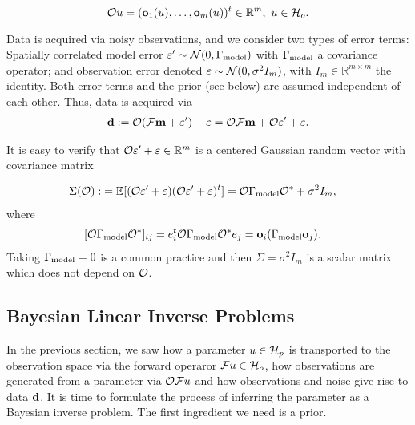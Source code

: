 \begin{equation*}%
  \obs u = (\meas_1(u), \dots, \meas_m(u) )^t \in \R^m,\ u \in \hilo.
\end{equation*}

Data is acquired via noisy observations, and we consider two types of
error terms: Spatially correlated model error \(\varepsilon' \sim
\mathcal{N}(0,\Gamma_{\textup{model}})\) with \(\Gamma_{\textup{model}}\) a covariance operator; and
observation error denoted \(\varepsilon \sim \mathcal{N}(0, \sigma^2 I_m)\), with
\(I_m \in \mathbb{R}^{m \times m}\) the identity. Both error terms and
the prior (see below) are assumed independent of each other. Thus,
data is acquired via
\begin{align}\label{eq:inverse_problem}
  \data := \obs (\fwd \param + \eps') + \eps = \obs \fwd \param + \obs \eps' + \eps.
\end{align}

It is easy to verify that \(\mathcal{O} \varepsilon' + \varepsilon \in \mathbb{R}^m\) is a centered
Gaussian random vector with covariance matrix

\begin{align}\label{eq:Sigma}
  \begin{split}
    \Sigma(\obs) :&= \mathbb{E}[ (\obs \eps' + \eps) (\obs \eps' +
      \eps)^t ]
    = \obs \modcov \obs^* + \sigma^2I_m , 
  \end{split}
\end{align}
where
\begin{align}\label{eq:modcov_explained}
  \begin{split}
    [\obs \modcov \obs^*]_{ij} & = e_i^t \obs \modcov \obs^* e_j 
    = \meas_i (\modcov \meas_j).%
  \end{split}
\end{align}
Taking \(\Gamma_{\textup{model}} = 0\) is a common practice
\cite{tarantola2005,kaipio2005,Vogel02} and then \(\Sigma =
\sigma^2I_m\) is a scalar matrix which does not depend on \(\mathcal{O}\).

\subsection{Bayesian Linear Inverse Problems}\label{subsec:bayesian_inverse_problems}
In the previous section, we saw how a parameter $u\in \mathcal{H}_p$ is
transported to the observation space via the forward operaror $\mathcal{F} u
\in \mathcal{H}_o$, how observations are generated from a parameter via $\mathcal{O}
\mathcal{F} u$ and how observations and noise give rise to data $\mathbf{d}$. It
is time to formulate the process of inferring the parameter as a
Bayesian inverse problem. The first ingredient we need is a prior.


